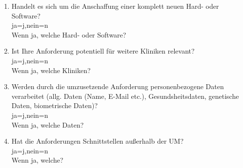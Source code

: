 \begin{Form}
\begin{enumerate}
	\item Handelt es sich um die Anschaffung einer komplett neuen Hard- oder Software? \\ 
	\ChoiceMenu[radio, radiosymbol=6 default=n, width=0.5cm, name=soha]{} {ja=j,nein=n} \\
	Wenn ja, welche Hard- oder Software? \\
	\TextField[multiline, name=jsoja,width=0.9\textwidth,  height=2cm, value={}]{}
	
	\item Ist Ihre Anforderung potentiell für weitere Kliniken relevant?
	 \\ \ChoiceMenu[radio, radiosymbol=6 default=n, width=0.5cm, name=user]{} {ja=j,nein=n} \\
	Wenn ja, welche Kliniken? \\
	\TextField[multiline, name=juser,width=0.9\textwidth,  height=2cm, value={}]{}
	
	\item Werden durch die umzusetzende Anforderung personenbezogene Daten verarbeitet (allg. Daten (Name, E-Mail etc.), Gesundsheitsdaten, genetische Daten, biometrische Daten)? \\ 
	\ChoiceMenu[radio, radiosymbol=6 default=n, width=0.5cm, name=persodata]{} {ja=j,nein=n} \\
	Wenn ja, welche Daten? \\
	\TextField[multiline, name=jpersodata,width=0.9\textwidth,  height=2cm, value={}]{}
	\newpage
	\item Hat die Anforderungen Schnittstellen außerhalb der UM? \\ 
	\ChoiceMenu[radio, radiosymbol=6 default=n, width=0.5cm, name=outum]{} {ja=j,nein=n} \\
	Wenn ja, welche? \\
	\TextField[multiline, name=joutum,width=0.9\textwidth,  height=2cm, value={}]{}

  \end{enumerate}
\end{Form}